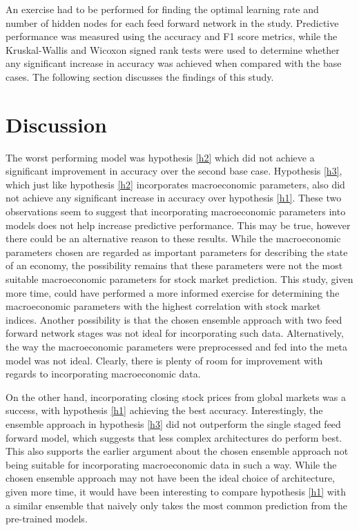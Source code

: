 \documentclass{UoYCSproject}
\begin{document}
An exercise had to be performed for finding the optimal learning rate and number of hidden nodes for each feed forward network in the study. Predictive performance was measured using the accuracy and F1 score metrics, while the Kruskal-Wallis and Wicoxon signed rank tests were used to determine whether any significant increase in accuracy was achieved when compared with the base cases. The following section discusses the findings of this study.

\section{Discussion}
 The worst performing model was hypothesis \ref{h2} which did not achieve a significant improvement in accuracy over the second base case. Hypothesis \ref{h3}, which just like hypothesis \ref{h2} incorporates macroeconomic parameters, also did not achieve any significant increase in accuracy over hypothesis \ref{h1}. These two observations seem to suggest that incorporating macroeconomic parameters into models does not help increase predictive performance. This may be true, however there could be an alternative reason to these results. While the macroeconomic parameters chosen are regarded as important parameters for describing the state of an economy, the possibility remains that these parameters were not the most suitable macroeconomic parameters for stock market prediction. This study, given more time, could have performed a more informed exercise for determining the macroeconomic parameters with the highest correlation with stock market indices. Another possibility is that the chosen ensemble approach with two feed forward network stages was not ideal for incorporating such data. Alternatively, the way the macroeconomic parameters were preprocessed and fed into the meta model was not ideal. Clearly, there is plenty of room for improvement with regards to incorporating macroeconomic data. 

On the other hand, incorporating closing stock prices from global markets was a success, with hypothesis \ref{h1} achieving the best accuracy. Interestingly, the ensemble approach in hypothesis \ref{h3} did not outperform the single staged feed forward model, which suggests that less complex architectures do perform best. This also supports the earlier argument about the chosen ensemble approach not being suitable for incorporating macroeconomic data in such a way. While the chosen ensemble approach may not have been the ideal choice of architecture, given more time, it would have been interesting to compare hypothesis \ref{h1} with a similar ensemble that naively only takes the most common prediction from the pre-trained models.
\end{document}
